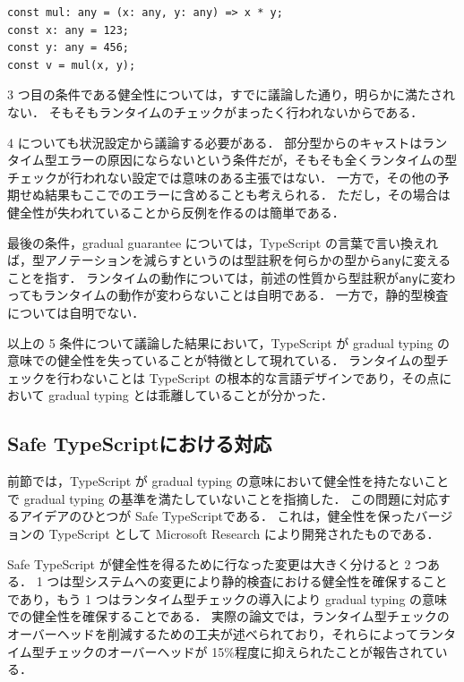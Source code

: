 \begin{lstlisting}
const mul: any = (x: any, y: any) => x * y;
const x: any = 123;
const y: any = 456;
const v = mul(x, y);
\end{lstlisting}

3 つ目の条件である健全性については，すでに議論した通り，明らかに満たされない．
そもそもランタイムのチェックがまったく行われないからである．

4 についても状況設定から議論する必要がある．
部分型からのキャストはランタイム型エラーの原因にならないという条件だが，そもそも全くランタイムの型チェックが行われない設定では意味のある主張ではない．
一方で，その他の予期せぬ結果もここでのエラーに含めることも考えられる．
ただし，その場合は健全性が失われていることから反例を作るのは簡単である．

最後の条件，gradual guarantee については，TypeScript の言葉で言い換えれば，型アノテーションを減らすというのは型註釈を何らかの型から\texttt{any}に変えることを指す．
ランタイムの動作については，前述の性質から型註釈が\texttt{any}に変わってもランタイムの動作が変わらないことは自明である．
一方で，静的型検査については自明でない．

以上の 5 条件について議論した結果において，TypeScript が gradual typing の意味での健全性を失っていることが特徴として現れている．
ランタイムの型チェックを行わないことは TypeScript の根本的な言語デザインであり，その点において gradual typing とは乖離していることが分かった．

\subsection{Safe TypeScriptにおける対応}
\label{sec:safe_typescript}

前節では，TypeScript が gradual typing の意味において健全性を持たないことで gradual typing の基準を満たしていないことを指摘した．
この問題に対応するアイデアのひとつが Safe TypeScript\cite{rastogi2015safe}である．
これは，健全性を保ったバージョンの TypeScript として Microsoft Research により開発されたものである．

Safe TypeScript が健全性を得るために行なった変更は大きく分けると 2 つある．
1 つは型システムへの変更により静的検査における健全性を確保することであり，もう 1 つはランタイム型チェックの導入により gradual typing の意味での健全性を確保することである．
実際の論文では，ランタイム型チェックのオーバーヘッドを削減するための工夫が述べられており，それらによってランタイム型チェックのオーバーヘッドが 15\%程度に抑えられたことが報告されている．

